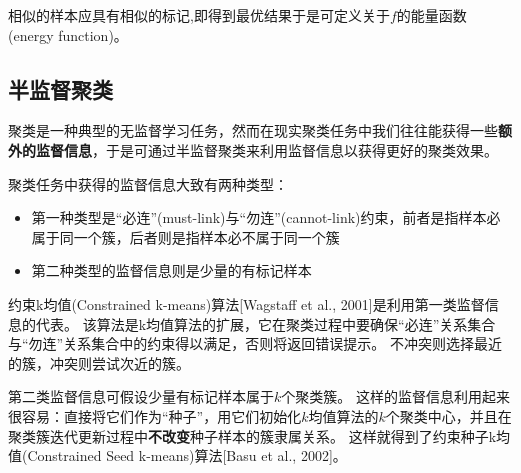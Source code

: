 相似的样本应具有相似的标记,即得到最优结果于是可定义关于$f$的能量函数(energy function)。

\subsection{半监督聚类}
聚类是一种典型的无监督学习任务，然而在现实聚类任务中我们往往能获得一些\textbf{额外的监督信息}，于是可通过半监督聚类来利用监督信息以获得更好的聚类效果。

聚类任务中获得的监督信息大致有两种类型：
\begin{itemize}
\item 第一种类型是“必连”(must-link)与“勿连”(cannot-link)约束，前者是指样本必属于同一个簇，后者则是指样本必不属于同一个簇
\item 第二种类型的监督信息则是少量的有标记样本
\end{itemize}

约束k均值(Constrained k-means)算法[Wagstaff et al., 2001]是利用第一类监督信息的代表。
该算法是k均值算法的扩展，它在聚类过程中要确保“必连”关系集合与“勿连”关系集合中的约束得以满足，否则将返回错误提示。
不冲突则选择最近的簇，冲突则尝试次近的簇。

第二类监督信息可假设少量有标记样本属于$k$个聚类簇。
这样的监督信息利用起来很容易：直接将它们作为“种子”，用它们初始化$k$均值算法的$k$个聚类中心，并且在聚类簇迭代更新过程中\textbf{不改变}种子样本的簇隶属关系。
这样就得到了约束种子k均值(Constrained Seed k-means)算法[Basu et al., 2002]。